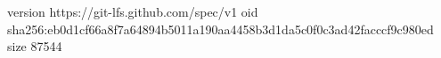 version https://git-lfs.github.com/spec/v1
oid sha256:eb0d1cf66a8f7a64894b5011a190aa4458b3d1da5c0f0c3ad42facccf9c980ed
size 87544
